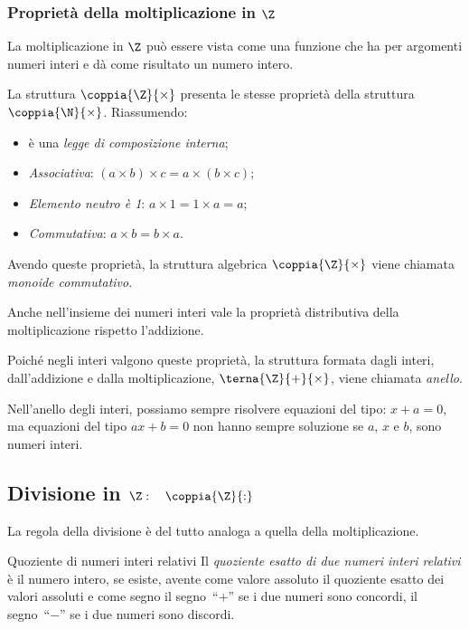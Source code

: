 \pagebreak %
\subsubsection{Proprietà della moltiplicazione in \(\Z\)}

La moltiplicazione in \(\Z\) può essere vista come una funzione che ha per 
argomenti numeri interi e dà come risultato un numero intero.

La struttura \(\coppia{\Z}{\times}\) presenta le stesse proprietà della 
struttura \(\coppia{\N}{\times}\).
Riassumendo:
\begin{itemize} [noitemsep]
 \item è una \emph{legge di composizione interna};
 \item \emph{Associativa}: \quad 
 \((a \times b) \times c = a \times (b \times c)\);
 \item \emph{Elemento neutro è 1}: \quad \(a \times 1 = 1 \times a = a\);
 \item \emph{Commutativa}: \quad \(a \times b = b \times a\).
\end{itemize}
Avendo queste proprietà, la struttura algebrica \(\coppia{\Z}{\times}\) viene 
chiamata \emph{monoide commutativo}.

Anche nell'insieme dei numeri interi vale la proprietà distributiva della
moltiplicazione rispetto l'addizione.

\bigskip
Poiché negli interi valgono queste proprietà, la struttura formata dagli 
interi, dall'addizione e dalla moltiplicazione, \(\terna{\Z}{+}{\times}\),
viene chiamata \emph{anello}.

Nell'anello degli interi, possiamo sempre risolvere equazioni del tipo:
\(x + a = 0\), ma equazioni del tipo \(ax + b = 0\) non hanno sempre 
soluzione se \(a\), \(x\) e \(b\), sono numeri interi.


\subsection{Divisione in $\Z: \quad \coppia{\Z}{:}$}

La regola della divisione è del tutto analoga a quella della 
moltiplicazione.

\begin{definizione}{Quoziente di numeri interi relativi}{}
Il \emph{quoziente esatto di due numeri interi relativi} è il numero intero, 
se esiste, avente come valore assoluto il quoziente esatto dei valori 
assoluti e come segno 
il segno~``\(+\)'' se i due numeri sono concordi,
il segno~``\(-\)'' se i due numeri sono discordi.
\end{definizione}

